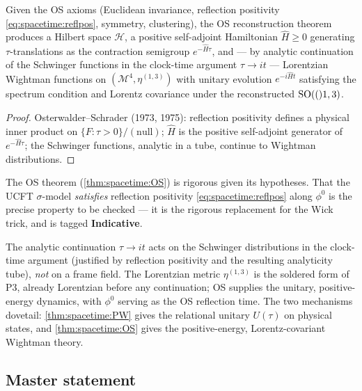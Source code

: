 \begin{theorem}
\label{thm:spacetime:OS}
Given the OS axioms (Euclidean invariance, reflection positivity
\eqref{eq:spacetime:reflpos}, symmetry, clustering), the OS reconstruction theorem
produces a Hilbert space $\mathcal H$, a positive self-adjoint Hamiltonian
$\widehat H\ge0$ generating $\tau$-translations as the contraction semigroup
$e^{-\widehat H\tau}$, and --- by analytic continuation of the Schwinger functions in
the clock-time argument $\tau\to it$ --- Lorentzian Wightman functions on
$(\mathcal M^4,\eta^{(1,3)})$ with unitary evolution $e^{-i\widehat H t}$ satisfying the
spectrum condition and Lorentz covariance under the reconstructed $\mathrm{SO}(()1,3)$.
\end{theorem}
\begin{proof}
Osterwalder--Schrader (1973, 1975): reflection positivity defines a physical inner
product on $\{F:\tau>0\}/(\text{null})$; $\widehat H$ is the positive self-adjoint
generator of $e^{-\widehat H\tau}$; the Schwinger functions, analytic in a tube,
continue to Wightman distributions.
\end{proof}

\begin{indicative}
\label{ind:spacetime:reflpos}
The OS theorem (\autoref{thm:spacetime:OS}) is rigorous given its hypotheses. That the
UCFT $\sigma$-model \emph{satisfies} reflection positivity \eqref{eq:spacetime:reflpos}
along $\phi^0$ is the precise property to be checked --- it is the rigorous
replacement for the Wick trick, and is tagged \textbf{Indicative}.
\end{indicative}

The analytic continuation $\tau\to it$ acts on the Schwinger distributions in the
clock-time argument (justified by reflection positivity and the resulting analyticity
tube), \emph{not} on a frame field. The Lorentzian metric $\eta^{(1,3)}$ is the
soldered form of P3, already Lorentzian before any continuation; OS supplies the
unitary, positive-energy dynamics, with $\phi^0$ serving as the OS reflection time. The
two mechanisms dovetail: \autoref{thm:spacetime:PW} gives the relational unitary
$U(\tau)$ on physical states, and \autoref{thm:spacetime:OS} gives the positive-energy,
Lorentz-covariant Wightman theory.

\subsection{Master statement}
\label{sec:spacetime:master}


